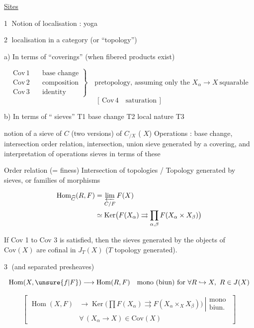 \uline{Sites}

\textcircled{1} Notion of localisation : yoga

\textcircled{2} localisation  in a category (or ``topology'')

a) In terms of ``coverings'' (when fibered products exist)

\[\left.\begin{aligned}\mathrm{Cov}\,1&\quad\text{base change}\\\mathrm{Cov}\,2&\quad\text{composition}\\\mathrm{Cov}\,3&\quad\text{identity}\end{aligned}\right\}\quad\text{pretopology, assuming only the } X_\alpha\to X\ \text{squarable}\] \[ [\,\mathrm{Cov}\,4\quad\text{saturation}\,]\]

b) In terms of `` sieves'' \quad T1 base change \quad T2 local nature \quad T3  

notion of a sieve of $C$ (two versions) of $C_{/X}$ ( $X$) Operations : base change, intersection order relation, intersection, union sieve generated by a covering, and interpretation of operations    sieves in terms of these

Order relation (= \deleted{\unsure{$\geq$}} finess) Intersection of topologies /   Topology generated by sieves, or families of morphisms 

\[\begin{aligned}\operatorname{Hom}_{\widehat C}(R,F)&=\varprojlim_{C/F}F(X)\\&\simeq\operatorname{Ker}\bigl(F(X_\alpha)\rightrightarrows\prod_{\alpha,\beta}F(X_\alpha\times X_{\beta})\bigr)\end{aligned}\]

If Cov 1 to Cov 3 is satisfied, then the  sieves generated by the objects of $\mathrm{Cov}(X)$ are cofinal in $J_T(X)$ ($T$ topology generated).

\textcircled{3} \uline{} (and separated presheaves) 

\[\operatorname{Hom}(X,\unsure{f|F})\longrightarrow\operatorname{Hom}(R,F)\quad\text{mono (biun) for }\forall R\hookrightarrow X,\ R\in J(X)\]

\[\left[\begin{aligned}\operatorname{Hom}(X,F)&\longrightarrow\operatorname{Ker}\bigl(\prod F(X_\alpha)\rightrightarrows F(X_\alpha\times_X X_\beta)\bigr)\ \left|\begin{array}{l}\text{mono}\\\text{biun.}\end{array}\right.\\ &\forall\,(X_\alpha\to X)\in\mathrm{Cov}(X)\end{aligned}\right]\]

